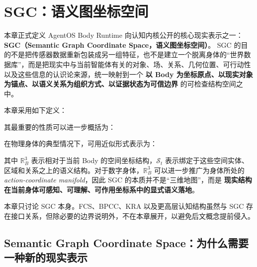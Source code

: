 \chapter{SGC：语义图坐标空间}

\begin{chapterlead}
本章正式定义 AgentOS Body Runtime 向认知内核公开的核心现实表示之一：
\textbf{SGC（Semantic Graph Coordinate Space，语义图坐标空间）}。
SGC 的目的不是把传感器数据重新包装成另一组特征，也不是建立一个脱离身体的“世界数据库”，而是把现实中与当前智能体有关的对象、场、关系、几何位置、可行动性以及这些信息的认识论来源，统一映射到一个
\textbf{以 Body 为坐标原点、以现实对象为锚点、以语义关系为组织方式、以证据状态为可信边界}
的可检查结构空间之中。

本章采用如下定义：
\begin{statementbox}
\centering
{}
\end{statementbox}

其最重要的性质可以进一步概括为：
\begin{statementbox}
\centering
{}
\end{statementbox}

在物理身体的典型情况下，可用近似形式表示为：
\begin{statementbox}
\centering
{}
\end{statementbox}
其中 $\mathbb{R}^{3}_{B}$ 表示相对于当前 Body 的空间坐标结构，$\mathcal S_t$ 表示绑定于这些空间实体、区域和关系之上的语义结构。对于数字身体，$\mathbb{R}^{3}_{B}$ 可以进一步推广为身体所处的
\emph{action-coordinate manifold}，因此 SGC 的本质并不是“三维地图”，而是
\textbf{现实结构在当前身体可感知、可理解、可作用坐标系中的显式语义落地}。

本章只讨论 SGC 本身。FCS、BPCC、KRA 以及更高层认知结构虽然与 SGC 存在接口关系，但除必要的边界说明外，不在本章展开，以避免后文概念提前侵入。
\end{chapterlead}

\section{Semantic Graph Coordinate Space：为什么需要一种新的现实表示}

